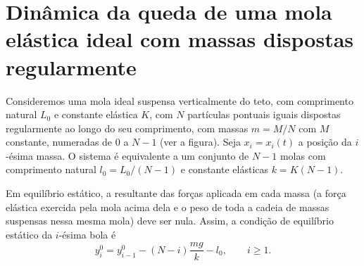 \documentclass{article}
\begin{document}
\section{Dinâmica da queda de uma mola elástica ideal com massas dispostas
regularmente}
\noindent
\begin{minipage}[t]{0.80\linewidth}
  \hspace{1.2em}
  Consideremos uma mola ideal suspensa verticalmente do teto, com comprimento
  natural $L_0$ e constante elástica $K$, com $N$ partículas pontuais iguais
  dispostas regularmente ao longo do seu comprimento, com massas $m=M/N$ com $M$
  constante, numeradas de 0 a $N-1$ (ver a figura). Seja $x_i=x_i(t)$ a posição
  da $i$-ésima massa. O sistema é equivalente a um conjunto de $N-1$ molas com
  comprimento natural $l_0=L_0/(N-1)$ e constante elásticas $k=K(N-1)$.

  Em equilíbrio estático, a resultante das forças aplicada em cada massa (a
  força elástica exercida pela mola acima dela e o peso de toda a cadeia de
  massas suspensas nessa mesma mola) deve ser nula. Assim, a condição de
  equilíbrio estático da $i$-ésima bola é
  \begin{equation}
    y^0_i = y^0_{i-1} - (N-i)\frac{mg}{k} - l_0, \qquad i\geq1.
  \end{equation}
\end{minipage}\hfill
{}
\end{document}

